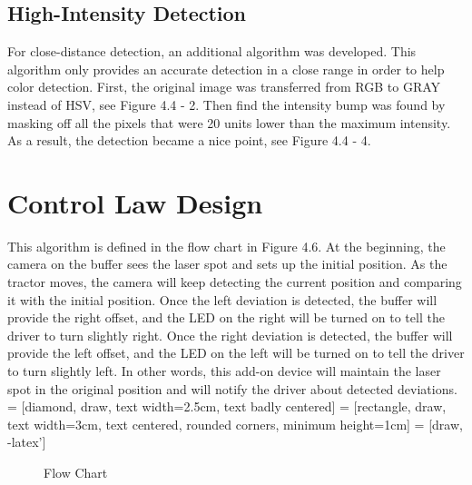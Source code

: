 \subsection{High-Intensity Detection}

For close-distance detection, an additional algorithm was developed. This algorithm only  provides an accurate detection in a close range in order to help color detection. First, the original image was transferred from RGB to GRAY instead of HSV, see Figure 4.4 - 2. Then find the intensity bump was found by masking off all the pixels that were 20 units lower than the maximum intensity. As a result, the detection became a nice point, see Figure 4.4 - 4.

\section{Control Law Design}
This algorithm is defined in the flow chart in Figure 4.6. At the beginning, the camera on the buffer sees the laser spot and sets up the initial position. As the tractor moves, the camera will keep detecting the current position and comparing it with the initial position. Once the left deviation is detected, the buffer will provide the right offset, and the LED on the right will be turned on to tell the driver to turn slightly right. Once the right deviation is detected, the buffer will provide the left offset, and the LED on the left will be turned on to tell the driver to turn slightly left.  In other words, this add-on device will maintain the laser spot in the original position and will notify the driver about detected deviations. 
 = [diamond, draw, text width=2.5cm, text badly centered]
 = [rectangle, draw, text width=3cm, text centered, rounded corners, minimum height=1cm]
 = [draw, -latex']
\begin{figure}[ht!]
\begin{center}
\caption{Flow Chart}
\end{center}
\end{figure}